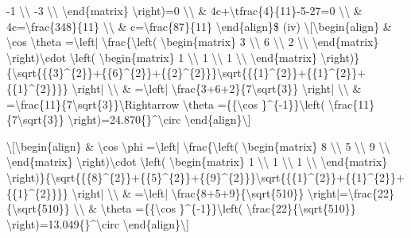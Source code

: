 -1 \textbackslash\textbackslash{} -3 \textbackslash\textbackslash{}
\textbackslash end\{matrix\} \textbackslash right)=0 \textbackslash\textbackslash{}
\& 4c+\textbackslash tfrac\{4\}\{11\}-5-27=0 \textbackslash\textbackslash{}
\& 4c=\textbackslash frac\{348\}\{11\} \textbackslash\textbackslash{}
\& c=\textbackslash frac\{87\}\{11\} \textbackslash end\{align\}\$
(iv) \textbackslash{[}\textbackslash begin\{align\} \& \textbackslash cos
\textbackslash theta =\textbackslash left| \textbackslash frac\{\textbackslash left(
\textbackslash begin\{matrix\} 3 \textbackslash\textbackslash{}
6 \textbackslash\textbackslash{} 2 \textbackslash\textbackslash{}
\textbackslash end\{matrix\} \textbackslash right)\textbackslash cdot
\textbackslash left( \textbackslash begin\{matrix\} 1 \textbackslash\textbackslash{}
1 \textbackslash\textbackslash{} 1 \textbackslash\textbackslash{}
\textbackslash end\{matrix\} \textbackslash right)\}\{\textbackslash sqrt\{\{\{3\}\textasciicircum\{2\}\}+\{\{6\}\textasciicircum\{2\}\}+\{\{2\}\textasciicircum\{2\}\}\}\textbackslash sqrt\{\{\{1\}\textasciicircum\{2\}\}+\{\{1\}\textasciicircum\{2\}\}+\{\{1\}\textasciicircum\{2\}\}\}\}
\textbackslash right| \textbackslash\textbackslash{} \& =\textbackslash left|
\textbackslash frac\{3+6+2\}\{7\textbackslash sqrt\{3\}\} \textbackslash right|
\textbackslash\textbackslash{} \& =\textbackslash frac\{11\}\{7\textbackslash sqrt\{3\}\}\textbackslash Rightarrow
\textbackslash theta =\{\{\textbackslash cos \}\textasciicircum\{-1\}\}\textbackslash left(
\textbackslash frac\{11\}\{7\textbackslash sqrt\{3\}\} \textbackslash right)=24.870\{\}\textasciicircum\textbackslash circ
\textbackslash end\{align\}\textbackslash{]}

\textbackslash{[}\textbackslash begin\{align\} \& \textbackslash cos
\textbackslash phi =\textbackslash left| \textbackslash frac\{\textbackslash left(
\textbackslash begin\{matrix\} 8 \textbackslash\textbackslash{}
5 \textbackslash\textbackslash{} 9 \textbackslash\textbackslash{}
\textbackslash end\{matrix\} \textbackslash right)\textbackslash cdot
\textbackslash left( \textbackslash begin\{matrix\} 1 \textbackslash\textbackslash{}
1 \textbackslash\textbackslash{} 1 \textbackslash\textbackslash{}
\textbackslash end\{matrix\} \textbackslash right)\}\{\textbackslash sqrt\{\{\{8\}\textasciicircum\{2\}\}+\{\{5\}\textasciicircum\{2\}\}+\{\{9\}\textasciicircum\{2\}\}\}\textbackslash sqrt\{\{\{1\}\textasciicircum\{2\}\}+\{\{1\}\textasciicircum\{2\}\}+\{\{1\}\textasciicircum\{2\}\}\}\}
\textbackslash right| \textbackslash\textbackslash{} \& =\textbackslash left|
\textbackslash frac\{8+5+9\}\{\textbackslash sqrt\{510\}\} \textbackslash right|=\textbackslash frac\{22\}\{\textbackslash sqrt\{510\}\}
\textbackslash\textbackslash{} \& \textbackslash theta =\{\{\textbackslash cos
\}\textasciicircum\{-1\}\}\textbackslash left( \textbackslash frac\{22\}\{\textbackslash sqrt\{510\}\}
\textbackslash right)=13.049\{\}\textasciicircum\textbackslash circ
\textbackslash end\{align\}\textbackslash{]}

